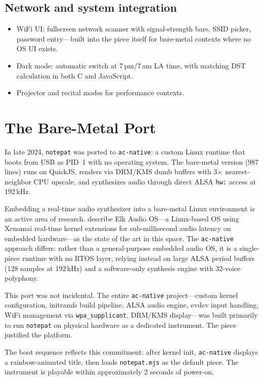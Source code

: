 \documentclass[10pt,letterpaper,twocolumn]{article}
\begin{document}
\subsection{Network and system integration}

\begin{itemize}
  \item WiFi UI: fullscreen network scanner with signal-strength bars, SSID picker, password entry---built into the piece itself for bare-metal contexts where no OS UI exists.
  \item Dark mode: automatic switch at 7\,pm/7\,am LA time, with matching DST calculation in both C and JavaScript.
  \item Projector and recital modes for performance contexts.
\end{itemize}

\section{The Bare-Metal Port}

In late 2024, \texttt{notepat} was ported to \texttt{ac-native}: a custom Linux runtime that boots from USB as PID~1 with no operating system. The bare-metal version (987 lines) runs on QuickJS, renders via DRM/KMS dumb buffers with 3$\times$ nearest-neighbor CPU upscale, and synthesizes audio through direct ALSA \texttt{hw:} access at 192\,kHz.

Embedding a real-time audio synthesizer into a bare-metal Linux environment is an active area of research. \citet{turchet2021elk} describe Elk Audio OS---a Linux-based OS using Xenomai real-time kernel extensions for sub-millisecond audio latency on embedded hardware---as the state of the art in this space. The \texttt{ac-native} approach differs: rather than a general-purpose embedded audio OS, it is a single-piece runtime with no RTOS layer, relying instead on large ALSA period buffers (128 samples at 192\,kHz) and a software-only synthesis engine with 32-voice polyphony.

This port was not incidental. The entire \texttt{ac-native} project---custom kernel configuration, initramfs build pipeline, ALSA audio engine, evdev input handling, WiFi management via \texttt{wpa\_supplicant}, DRM/KMS display---was built primarily to run \texttt{notepat} on physical hardware as a dedicated instrument. The piece justified the platform.

The boot sequence reflects this commitment: after kernel init, \texttt{ac-native} displays a rainbow-animated title, then loads \texttt{notepat.mjs} as the default piece. The instrument is playable within approximately 2 seconds of power-on.
\end{document}
